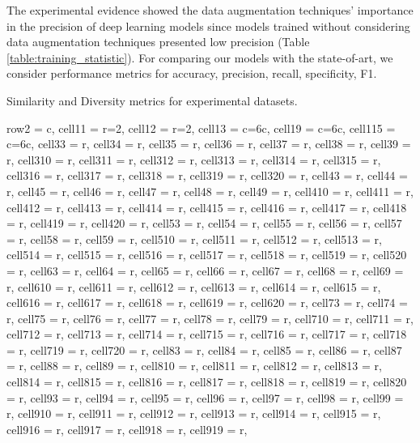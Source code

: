 \documentclass[journal]{IEEEtran}
\begin{document}
The experimental evidence showed the data augmentation techniques' importance in the precision of deep learning models since models trained without considering data augmentation techniques presented low precision (Table \ref{table:training_statistic}).
For comparing our models with the state-of-art, we consider performance metrics for accuracy, precision, recall, specificity, F1.

\begin{table}
\caption{Similarity and Diversity metrics for experimental datasets.}
\centering
\begin{adjustbox}{width=\textwidth}
\begin{tblr}{
  row{2} = {c},  cell{1}{1} = {r=2}{},  cell{1}{2} = {r=2}{},  cell{1}{3} = {c=6}{c},  cell{1}{9} = {c=6}{c},  cell{1}{15} = {c=6}{c},  cell{3}{3} = {r},  cell{3}{4} = {r},  cell{3}{5} = {r},  cell{3}{6} = {r},  cell{3}{7} = {r},  cell{3}{8} = {r},  cell{3}{9} = {r},  cell{3}{10} = {r},  cell{3}{11} = {r},  cell{3}{12} = {r},  cell{3}{13} = {r},  cell{3}{14} = {r},  cell{3}{15} = {r},  cell{3}{16} = {r},  cell{3}{17} = {r},  cell{3}{18} = {r},  cell{3}{19} = {r},  cell{3}{20} = {r},  cell{4}{3} = {r},  cell{4}{4} = {r},  cell{4}{5} = {r},  cell{4}{6} = {r},  cell{4}{7} = {r},  cell{4}{8} = {r},  cell{4}{9} = {r},  cell{4}{10} = {r},  cell{4}{11} = {r},  cell{4}{12} = {r},  cell{4}{13} = {r},  cell{4}{14} = {r},  cell{4}{15} = {r},  cell{4}{16} = {r},  cell{4}{17} = {r},  cell{4}{18} = {r},  cell{4}{19} = {r},  cell{4}{20} = {r},  cell{5}{3} = {r},  cell{5}{4} = {r},  cell{5}{5} = {r},  cell{5}{6} = {r},  cell{5}{7} = {r},  cell{5}{8} = {r},  cell{5}{9} = {r},  cell{5}{10} = {r},  cell{5}{11} = {r},  cell{5}{12} = {r},  cell{5}{13} = {r},  cell{5}{14} = {r},  cell{5}{15} = {r},  cell{5}{16} = {r},  cell{5}{17} = {r},  cell{5}{18} = {r},  cell{5}{19} = {r},  cell{5}{20} = {r},  cell{6}{3} = {r},  cell{6}{4} = {r},  cell{6}{5} = {r},  cell{6}{6} = {r},  cell{6}{7} = {r},  cell{6}{8} = {r},  cell{6}{9} = {r},  cell{6}{10} = {r},  cell{6}{11} = {r},  cell{6}{12} = {r},  cell{6}{13} = {r},  cell{6}{14} = {r},  cell{6}{15} = {r},  cell{6}{16} = {r},  cell{6}{17} = {r},  cell{6}{18} = {r},  cell{6}{19} = {r},  cell{6}{20} = {r},  cell{7}{3} = {r},  cell{7}{4} = {r},  cell{7}{5} = {r},  cell{7}{6} = {r},  cell{7}{7} = {r},  cell{7}{8} = {r},  cell{7}{9} = {r},  cell{7}{10} = {r},  cell{7}{11} = {r},  cell{7}{12} = {r},  cell{7}{13} = {r},  cell{7}{14} = {r},  cell{7}{15} = {r},  cell{7}{16} = {r},  cell{7}{17} = {r},  cell{7}{18} = {r},  cell{7}{19} = {r},  cell{7}{20} = {r},  cell{8}{3} = {r},  cell{8}{4} = {r},  cell{8}{5} = {r},  cell{8}{6} = {r},  cell{8}{7} = {r},  cell{8}{8} = {r},  cell{8}{9} = {r},  cell{8}{10} = {r},  cell{8}{11} = {r},  cell{8}{12} = {r},  cell{8}{13} = {r},  cell{8}{14} = {r},  cell{8}{15} = {r},  cell{8}{16} = {r},  cell{8}{17} = {r},  cell{8}{18} = {r},  cell{8}{19} = {r},  cell{8}{20} = {r},  cell{9}{3} = {r},  cell{9}{4} = {r},  cell{9}{5} = {r},  cell{9}{6} = {r},  cell{9}{7} = {r},  cell{9}{8} = {r},  cell{9}{9} = {r},  cell{9}{10} = {r},  cell{9}{11} = {r},  cell{9}{12} = {r},  cell{9}{13} = {r},  cell{9}{14} = {r},  cell{9}{15} = {r},  cell{9}{16} = {r},  cell{9}{17} = {r},  cell{9}{18} = {r},  cell{9}{19} = {r},  }
\end{tblr}
\end{adjustbox}
\end{table}
\end{document}
